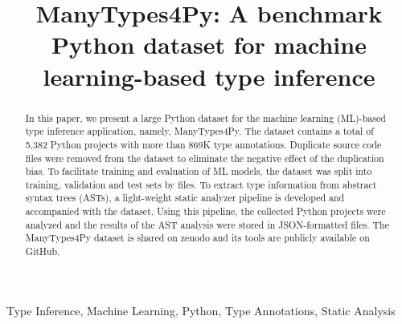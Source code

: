 \documentclass[10pt, conference]{IEEEtran}
\begin{document}
\title{ManyTypes4Py: A benchmark Python dataset for machine learning-based type inference\\
}

\author{
\and
{}
\and
{}
}

\maketitle

\begin{abstract}
In this paper, we present a large Python dataset for the machine learning (ML)-based type inference application, namely, ManyTypes4Py. The dataset contains a total of 5,382 Python projects with more than 869K type annotations. Duplicate source code files were removed from the dataset to eliminate the negative effect of the duplication bias. To facilitate training and evaluation of ML models, the dataset was split into training, validation and test sets by files. To extract type information from abstract syntax trees (ASTs), a light-weight static analyzer pipeline is developed and accompanied with the dataset. Using this pipeline, the collected Python projects were analyzed and the results of the AST analysis were stored in JSON-formatted files. The ManyTypes4Py dataset is shared on zenodo and its tools are publicly available on GitHub.
\end{abstract}

\begin{IEEEkeywords}
Type Inference, Machine Learning, Python, Type Annotations, Static Analysis
\end{IEEEkeywords}
\end{document}
